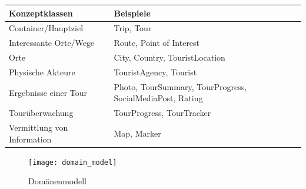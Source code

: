 \documentclass[a4paper,10pt,xetex]{article}
\begin{document}
\begin{longtabu} to \textwidth { | l | X[l] | }
\hline
\textbf{Konzeptklassen} & \textbf{Beispiele} \\\hline
\endhead
Container/Hauptziel         & Trip, Tour                                               \\\hline 
Interessante Orte/Wege     & Route, Point of Interest                                \\\hline 
Orte                       & City, Country, TouristLocation                           \\\hline 
Physische Akteure          & TouristAgency, Tourist                                   \\\hline 
Ergebnisse einer Tour      & Photo, TourSummary, TourProgress, SocialMediaPost, Rating \\\hline 
Tourüberwachung           & TourProgress, TourTracker                                \\\hline
Vermittlung von Information & Map, Marker                                              \\\hline 
\end{longtabu}

\begin{figure}
  \centering
  \texttt{[image: domain\_model]}
  \caption{Domänenmodell}
\end{figure}
\end{document}
